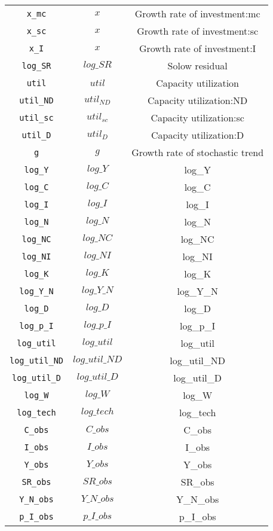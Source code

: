 \begin{center}
\begin{longtable}{ccc}
\texttt{x\_mc} & ${x}$ & Growth rate of investment:mc\\
\texttt{x\_sc} & ${x}$ & Growth rate of investment:sc\\
\texttt{x\_I} & ${x}$ & Growth rate of investment:I\\
\texttt{log\_SR} & $log\_SR$ & Solow residual\\
\texttt{util} & ${util}$ & Capacity utilization\\
\texttt{util\_ND} & ${util_{ND}}$ & Capacity utilization:ND\\
\texttt{util\_sc} & ${util_{sc}}$ & Capacity utilization:sc\\
\texttt{util\_D} & ${util_D}$ & Capacity utilization:D\\
\texttt{g} & ${g}$ & Growth rate of stochastic trend\\
\texttt{log\_Y} & $log\_Y$ & log\_Y\\
\texttt{log\_C} & $log\_C$ & log\_C\\
\texttt{log\_I} & $log\_I$ & log\_I\\
\texttt{log\_N} & $log\_N$ & log\_N\\
\texttt{log\_NC} & $log\_NC$ & log\_NC\\
\texttt{log\_NI} & $log\_NI$ & log\_NI\\
\texttt{log\_K} & $log\_K$ & log\_K\\
\texttt{log\_Y\_N} & $log\_Y\_N$ & log\_Y\_N\\
\texttt{log\_D} & $log\_D$ & log\_D\\
\texttt{log\_p\_I} & $log\_p\_I$ & log\_p\_I\\
\texttt{log\_util} & $log\_util$ & log\_util\\
\texttt{log\_util\_ND} & $log\_util\_ND$ & log\_util\_ND\\
\texttt{log\_util\_D} & $log\_util\_D$ & log\_util\_D\\
\texttt{log\_W} & $log\_W$ & log\_W\\
\texttt{log\_tech} & $log\_tech$ & log\_tech\\
\texttt{C\_obs} & $C\_obs$ & C\_obs\\
\texttt{I\_obs} & $I\_obs$ & I\_obs\\
\texttt{Y\_obs} & $Y\_obs$ & Y\_obs\\
\texttt{SR\_obs} & $SR\_obs$ & SR\_obs\\
\texttt{Y\_N\_obs} & $Y\_N\_obs$ & Y\_N\_obs\\
\texttt{p\_I\_obs} & $p\_I\_obs$ & p\_I\_obs\\

\end{longtable}
\end{center}
